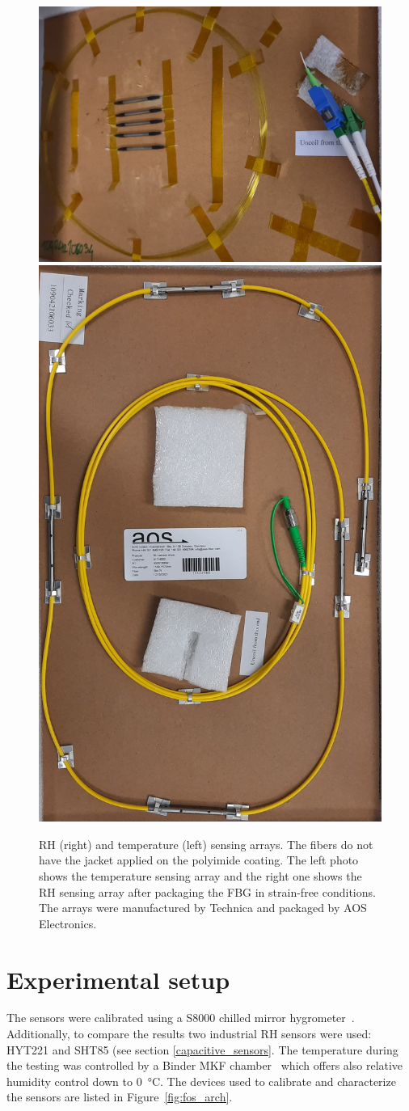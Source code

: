 \begin{figure}[!h]
\centering
\includegraphics[angle=90,width=0.43\columnwidth]{Chapter5/images/t_array1.jpg}
\includegraphics[angle=90,width=0.52\columnwidth]{Chapter5/images/rh_array1.jpg}
\caption{\gls{RH} (right) and temperature (left) sensing arrays. The fibers do not have the jacket applied on the polyimide coating. The left photo shows the temperature sensing array and the right one shows the \gls{RH} sensing array after packaging the FBG in strain-free conditions. The arrays were manufactured by Technica and packaged by AOS Electronics.}
\label{fig_array_photo}
\end{figure}
\newpage
\section{Experimental setup}
\label{fos:setup}
The sensors were calibrated using a S8000 chilled mirror hygrometer~\cite{michell_s8000}. Additionally, to compare the results two industrial \gls{RH} sensors were used: HYT221 and SHT85 (see section \ref{capacitive_sensors}. The temperature during the testing was controlled by a Binder MKF chamber~\cite{binder} which offers also relative humidity control down to \SI{0}{\celsius}. The devices used to calibrate and characterize the sensors are listed in Figure~\ref{fig:fos_arch}. 

